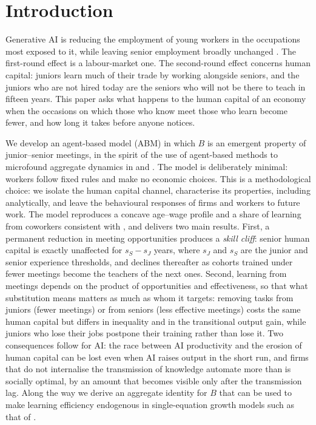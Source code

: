 \documentclass[preprint,12pt,authoryear]{elsarticle}
\begin{document}
\section{Introduction}

Generative AI is reducing the employment of young workers in the occupations most exposed to it, while leaving senior employment broadly unchanged \citep{Brynjolfsson2025,HosseiniLichtinger2025}. The first-round effect is a labour-market one. The second-round effect concerns human capital: juniors learn much of their trade by working alongside seniors, and the juniors who are not hired today are the seniors who will not be there to teach in fifteen years. This paper asks what happens to the human capital of an economy when the occasions on which those who know meet those who learn become fewer, and how long it takes before anyone notices.

We develop an agent-based model (ABM) in which $B$ is an emergent property of junior--senior meetings, in the spirit of the use of agent-based methods to microfound aggregate dynamics in \citet{Bassi2022} and \citet{RailsbackGrimm2011}. The model is deliberately minimal: workers follow fixed rules and make no economic choices. This is a methodological choice: we isolate the human capital channel, characterise its properties, including analytically, and leave the behavioural responses of firms and workers to future work. The model reproduces a concave age--wage profile and a share of learning from coworkers consistent with \citet{Jarosch2021}, and delivers two main results. First, a permanent reduction in meeting opportunities produces a \emph{skill cliff}: senior human capital is exactly unaffected for $s_S - s_J$ years, where $s_J$ and $s_S$ are the junior and senior experience thresholds, and declines thereafter as cohorts trained under fewer meetings become the teachers of the next ones. Second, learning from meetings depends on the product of opportunities and effectiveness, so that what substitution means matters as much as whom it targets: removing tasks from juniors (fewer meetings) or from seniors (less effective meetings) costs the same human capital but differs in inequality and in the transitional output gain, while juniors who lose their jobs postpone their training rather than lose it. Two consequences follow for AI: the race between AI productivity and the erosion of human capital can be lost even when AI raises output in the short run, and firms that do not internalise the transmission of knowledge automate more than is socially optimal, by an amount that becomes visible only after the transmission lag. Along the way we derive an aggregate identity for $B$ that can be used to make learning efficiency endogenous in single-equation growth models such as that of \citet{Lucas1988}.
\end{document}
